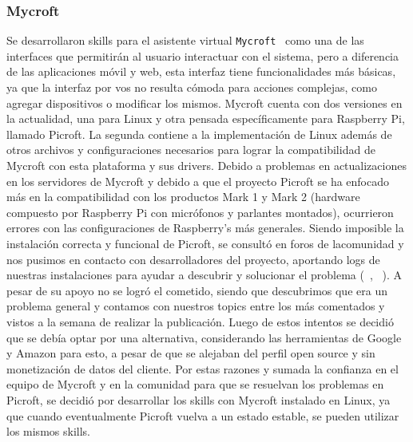 \subsubsection{Mycroft}

Se desarrollaron skills para el asistente virtual \lstinline[columns=fixed]{Mycroft}~\cite{Mycroft} como una de las interfaces que permitirán al usuario interactuar con el sistema, pero a diferencia de las aplicaciones móvil y web, esta interfaz tiene funcionalidades más básicas, ya que la interfaz por vos no resulta cómoda para acciones complejas, como agregar dispositivos o modificar los mismos.
Mycroft cuenta con dos versiones en la actualidad, una para Linux y otra pensada específicamente para Raspberry Pi, llamado Picroft. La segunda contiene a la implementación de Linux además de otros archivos y configuraciones necesarios para lograr la compatibilidad de Mycroft con esta plataforma y sus drivers.
Debido a problemas en actualizaciones en los servidores de Mycroft y debido a que el proyecto Picroft se ha enfocado más en la compatibilidad con los productos Mark 1 y Mark 2 (hardware compuesto por Raspberry Pi con micrófonos y parlantes montados), ocurrieron errores con las configuraciones de Raspberry's más generales.
Siendo imposible la instalación correcta y funcional de Picroft, se consultó en foros de lacomunidad y nos pusimos en contacto con desarrolladores del proyecto, aportando logs de nuestras instalaciones para ayudar a descubrir y solucionar el problema (~\cite{Topic1}, ~\cite{Topic2}).
A pesar de su apoyo no se logró el cometido, siendo que descubrimos que era un problema general y contamos con nuestros topics entre los más comentados y vistos a la semana de realizar la publicación.
Luego de estos intentos se decidió que se debía optar por una alternativa, considerando las herramientas de Google y Amazon para esto, a pesar de que se alejaban del perfil open source y sin monetización de datos del cliente. Por estas razones y sumada la confianza en el equipo de Mycroft y en la comunidad para que se resuelvan los problemas en Picroft, se decidió por desarrollar los skills con Mycroft instalado en Linux, ya que cuando eventualmente Picroft vuelva a un estado estable, se pueden utilizar los mismos skills.

